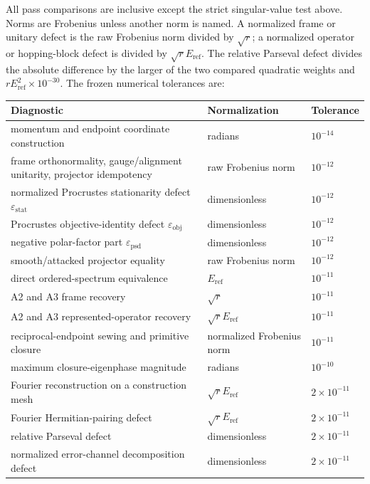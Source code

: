 \documentclass[11pt]{article}
\begin{document}
All pass comparisons are inclusive except the strict singular-value test above. Norms
are Frobenius unless another norm is named. A normalized frame or unitary defect is the
raw Frobenius norm divided by $\sqrt r$; a normalized operator or hopping-block defect is
divided by $\sqrt rE_{\mathrm{ref}}$. The relative Parseval defect divides the absolute
difference by the larger of the two compared quadratic weights and
$rE_{\mathrm{ref}}^2\times10^{-30}$. The frozen numerical tolerances are:

\begin{center}\small
\begin{tabularx}{\textwidth}{YYY}
\toprule
\textbf{Diagnostic} & \textbf{Normalization} & \textbf{Tolerance} \\
\midrule
momentum and endpoint coordinate construction & radians & $10^{-14}$ \\
frame orthonormality, gauge/alignment unitarity, projector idempotency & raw Frobenius norm & $10^{-12}$ \\
normalized Procrustes stationarity defect $\varepsilon_{\mathrm{stat}}$ & dimensionless & $10^{-12}$ \\
Procrustes objective-identity defect $\varepsilon_{\mathrm{obj}}$ & dimensionless & $10^{-12}$ \\
negative polar-factor part $\varepsilon_{\mathrm{psd}}$ & dimensionless & $10^{-12}$ \\
smooth/attacked projector equality & raw Frobenius norm & $10^{-12}$ \\
direct ordered-spectrum equivalence & $E_{\mathrm{ref}}$ & $10^{-11}$ \\
A2 and A3 frame recovery & $\sqrt r$ & $10^{-11}$ \\
A2 and A3 represented-operator recovery & $\sqrt rE_{\mathrm{ref}}$ & $10^{-11}$ \\
reciprocal-endpoint sewing and primitive closure & normalized Frobenius norm & $10^{-11}$ \\
maximum closure-eigenphase magnitude & radians & $10^{-10}$ \\
Fourier reconstruction on a construction mesh & $\sqrt rE_{\mathrm{ref}}$ & $2\times10^{-11}$ \\
Fourier Hermitian-pairing defect & $\sqrt rE_{\mathrm{ref}}$ & $2\times10^{-11}$ \\
relative Parseval defect & dimensionless & $2\times10^{-11}$ \\
normalized error-channel decomposition defect & dimensionless & $2\times10^{-11}$ \\

\end{tabularx}
\end{center}
\end{document}
